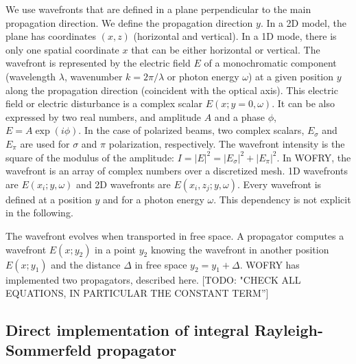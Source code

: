\documentclass{iopconfser}
\newcommand{\todo}[1]{{\color{red}[TODO: "#1'']}}
\begin{document}
We use wavefronts that are defined in a plane perpendicular to the main propagation direction. We define the propagation direction $y$. In a 2D model, the plane has coordinates $(x,z)$ (horizontal and vertical). In a 1D mode, there is only one spatial coordinate $x$ that can be either horizontal or vertical. 
The wavefront is represented by the electric field $E$ of a monochromatic component (wavelength $\lambda$, wavenumber $k = 2 \pi / \lambda$ or photon energy $\omega$) at a given position $y$ along the propagation direction (coincident with the optical axis).
This electric field or electric disturbance is a complex scalar $E(x;y=0,\omega)$. It can be also expressed by two real numbers, and amplitude $A$ and a phase $\phi$,  $E= A \exp{(i\phi)}$. In the case of polarized beams, two complex scalars, $E_\sigma$ and $E_\pi$ are used for $\sigma$ and $\pi$ polarization, respectively.
The wavefront intensity is the square of the modulus of the amplitude: $I=|E|^2=|E_\sigma|^2 + |E_\pi|^2$. In WOFRY, the wavefront is an array of complex numbers over a discretized mesh. 1D wavefronts are $E(x_i;y,\omega)$ and 2D wavefronts are $E(x_i,z_j;y,\omega)$. Every wavefront is defined at a position $y$ and for a photon energy $\omega$. This dependency is not explicit in the following.

The wavefront evolves when transported in free space. A propagator computes a wavefront $E(x;y_2)$ in a point $y_2$ knowing the wavefront in another position $E(x;y_1)$ and the distance $\Delta$ in free space $y_2 = y_1 + \Delta$. WOFRY has implemented two propagators, described here. \todo{CHECK ALL EQUATIONS, IN PARTICULAR THE CONSTANT TERM}

\subsection{Direct implementation of integral Rayleigh-Sommerfeld propagator}
\label{sec:integralPropagator}
\end{document}
